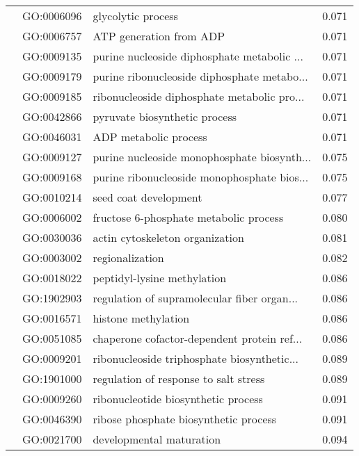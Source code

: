 \begin{longtable}{lllr}
   & GO:0006096 &                           glycolytic process &         0.071 \\
   & GO:0006757 &                      ATP generation from ADP &         0.071 \\
   & GO:0009135 &  purine nucleoside diphosphate metabolic ... &         0.071 \\
   & GO:0009179 &  purine ribonucleoside diphosphate metabo... &         0.071 \\
   & GO:0009185 &  ribonucleoside diphosphate metabolic pro... &         0.071 \\
   & GO:0042866 &                pyruvate biosynthetic process &         0.071 \\
   & GO:0046031 &                        ADP metabolic process &         0.071 \\
   & GO:0009127 &  purine nucleoside monophosphate biosynth... &         0.075 \\
   & GO:0009168 &  purine ribonucleoside monophosphate bios... &         0.075 \\
   & GO:0010214 &                        seed coat development &         0.077 \\
   & GO:0006002 &       fructose 6-phosphate metabolic process &         0.080 \\
   & GO:0030036 &              actin cytoskeleton organization &         0.081 \\
   & GO:0003002 &                              regionalization &         0.082 \\
   & GO:0018022 &                  peptidyl-lysine methylation &         0.086 \\
   & GO:1902903 &  regulation of supramolecular fiber organ... &         0.086 \\
   & GO:0016571 &                          histone methylation &         0.086 \\
   & GO:0051085 &  chaperone cofactor-dependent protein ref... &         0.086 \\
   & GO:0009201 &  ribonucleoside triphosphate biosynthetic... &         0.089 \\
   & GO:1901000 &        regulation of response to salt stress &         0.089 \\
   & GO:0009260 &          ribonucleotide biosynthetic process &         0.091 \\
   & GO:0046390 &        ribose phosphate biosynthetic process &         0.091 \\
   & GO:0021700 &                     developmental maturation &         0.094 \\

\end{longtable}
